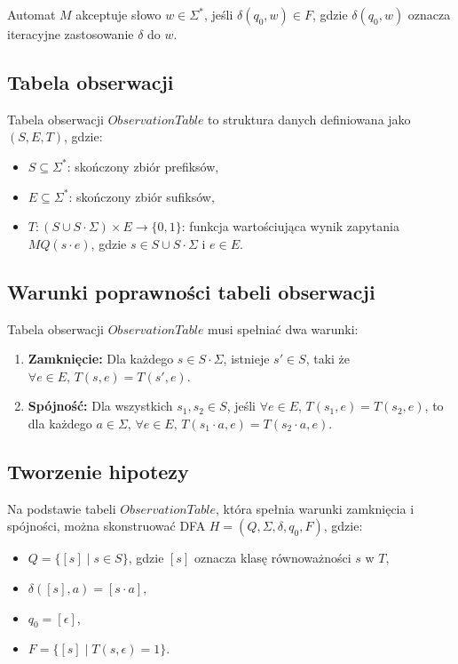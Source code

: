 Automat \( M \) akceptuje słowo \( w \in \Sigma^* \), jeśli \( \delta(q_0, w) \in F \), gdzie \( \delta(q_0, w) \) oznacza iteracyjne zastosowanie \( \delta \) do \( w \).

\subsection{Tabela obserwacji}

Tabela obserwacji \( ObservationTable \) to struktura danych definiowana jako \( (S, E, T) \), gdzie:
\begin{itemize}
    \item \( S \subseteq \Sigma^* \): skończony zbiór prefiksów,
    \item \( E \subseteq \Sigma^* \): skończony zbiór sufiksów,
    \item \( T: (S \cup S \cdot \Sigma) \times E \to \{0, 1\} \): funkcja wartościująca wynik zapytania \( MQ(s \cdot e) \), gdzie \( s \in S \cup S \cdot \Sigma \) i \( e \in E \).
\end{itemize}

\subsection{Warunki poprawności tabeli obserwacji}

Tabela obserwacji \( ObservationTable \) musi spełniać dwa warunki:
\begin{enumerate}
    \item \textbf{Zamknięcie:} Dla każdego \( s \in S \cdot \Sigma \), istnieje \( s' \in S \), taki że \( \forall e \in E, \, T(s, e) = T(s', e) \).
    \item \textbf{Spójność:} Dla wszystkich \( s_1, s_2 \in S \), jeśli \( \forall e \in E, \, T(s_1, e) = T(s_2, e) \), to dla każdego \( a \in \Sigma \), \( \forall e \in E, \, T(s_1 \cdot a, e) = T(s_2 \cdot a, e) \).
\end{enumerate}

\subsection{Tworzenie hipotezy}

Na podstawie tabeli \( ObservationTable \), która spełnia warunki zamknięcia i spójności, można skonstruować DFA \( H = (Q, \Sigma, \delta, q_0, F) \), gdzie:
\begin{itemize}
    \item \( Q = \{[s] \mid s \in S\} \), gdzie \( [s] \) oznacza klasę równoważności \( s \) w \( T \),
    \item \( \delta([s], a) = [s \cdot a] \),
    \item \( q_0 = [\epsilon] \),
    \item \( F = \{[s] \mid T(s, \epsilon) = 1\} \).
\end{itemize}

